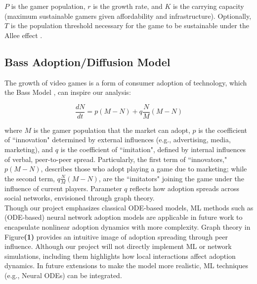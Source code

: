 \documentclass{article}
\begin{document}
\noindent $P$ is the gamer population, $r$ is the growth rate, and $K$ is the carrying capacity (maximum sustainable gamers given affordability and infrastructure). Optionally, $T$ is the population threshold necessary for the game to be sustainable under the Allee effect \cite{9b04f3dc-918b-391a-9a53-ddc05d360c66}.  

\subsection{Bass Adoption/Diffusion Model}
The growth of video games is a form of consumer adoption of technology, which the Bass Model \cite{916272ae-6b7a-3e62-b7e2-5747187dae7b, f1542a98-16de-3de1-ac28-c48c9779e63f}, can inspire our analysis: 

\begin{equation}
    \frac{dN}{dt} = p \left(M - N\right) + q \frac{N}{M} \left(M - N\right)
\end{equation}

\noindent where $M$ is the gamer population that the market can adopt, $p$ is the coefficient of ``innovation" determined by external influences (e.g., advertising, media, marketing), and $q$ is the coefficient of ``imitation", defined by internal influences of verbal, peer-to-peer spread. Particularly, the first term of ``innovators," $p \left(M - N\right)$, describes those who adopt playing a game due to marketing; while the second term, $ q \frac{N}{M} \left(M - N\right) $, are the ``imitators" joining the game under the influence of current players. Parameter $q$ reflects how adoption spreads across social networks, envisioned through graph theory. \\ 


\noindent Though our project emphasizes classical ODE-based models, ML methods such as (ODE-based) neural network adoption models are applicable in future work to encapsulate nonlinear adoption dynamics with more complexity. Graph theory in Figure\textbf{(1)} provides an intuitive image of adoption spreading through peer influence. Although our project will not directly implement ML or network simulations, including them highlights how local interactions affect adoption dynamics. In future extensions to make the model more realistic, ML techniques (e.g., Neural ODEs) can be integrated.
\end{document}
